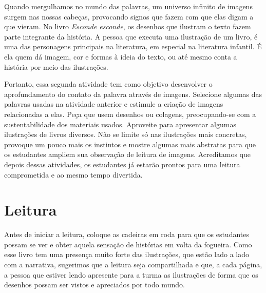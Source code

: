 \documentclass[11pt]{extarticle}
\begin{document}

Quando mergulhamos no mundo das palavras, um universo infinito de imagens surgem nas nossas cabeças, provocando signos que fazem com que elas digam a que vieram. No livro \textit{Esconde esconde}, os desenhos que ilustram o texto fazem parte integrante da história. A pessoa que executa uma ilustração de um livro, é uma das personagens principais na literatura, em especial na literatura infantil. É ela quem dá imagem, cor e formas à ideia do texto, ou até mesmo conta a história por meio das ilustrações. 

Portanto, essa segunda atividade tem como objetivo desenvolver o aprofundamento do contato da palavra através de imagens. Selecione algumas das palavras usadas na atividade anterior e estimule a criação de imagens relacionadas a elas. Peça que usem desenhos ou colagens, preocupando-se com a sustentabilidade dos materiais usados. Aproveite para apresentar algumas ilustrações de livros diversos. Não se limite só nas ilustrações mais concretas, provoque um pouco mais os instintos e mostre algumas mais abstratas para que os estudantes ampliem sua observação de leitura de imagens. Acreditamos que depois dessas atividades, os estudantes já estarão prontos para uma leitura comprometida e ao mesmo tempo divertida. 


\section{Leitura}


Antes de iniciar a leitura, coloque as cadeiras em roda para que os estudantes possam se ver e obter aquela sensação de histórias em volta da fogueira. Como esse livro tem uma presença muito forte das ilustrações, que estão lado a lado com a narrativa, sugerimos que a leitura seja compartilhada e que, a cada página, a pessoa que estiver lendo apresente para a turma as ilustrações de forma que os desenhos possam ser vistos e apreciados por todo mundo. 
\end{document}
